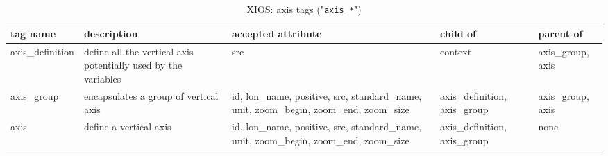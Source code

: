 \documentclass[../main/NEMO_manual]{subfiles}
\begin{document}
\begin{table}
  \begin{tabularx}{\textwidth}{|l|X|X|X|X|}
    \hline
    tag name                                                                               &
    description                                                                            &
    accepted attribute                                                                     &
    child of                                                                               &
    parent of         \\
    \hline
    \hline
    axis\_definition                                                                       &
    define all the vertical axis potentially used by the variables                         &
    src                                                                                    &
    context                                                                                &
    axis\_group, axis \\
    \hline
    axis\_group                                                                            &
    encapsulates a group of vertical axis                                                  &
    id, lon\_name, positive, src, standard\_name, unit, zoom\_begin, zoom\_end, zoom\_size &
    axis\_definition, axis\_group                                                          &
    axis\_group, axis \\
    \hline
    axis                                                                                   &
    define a vertical axis                                                                 &
    id, lon\_name, positive, src, standard\_name, unit, zoom\_begin, zoom\_end, zoom\_size &
    axis\_definition, axis\_group                                                          &
    none					\\
    \hline
  \end{tabularx}
  \caption{XIOS: axis tags ("\texttt{axis\_*}")}
\end{table}
\end{document}
